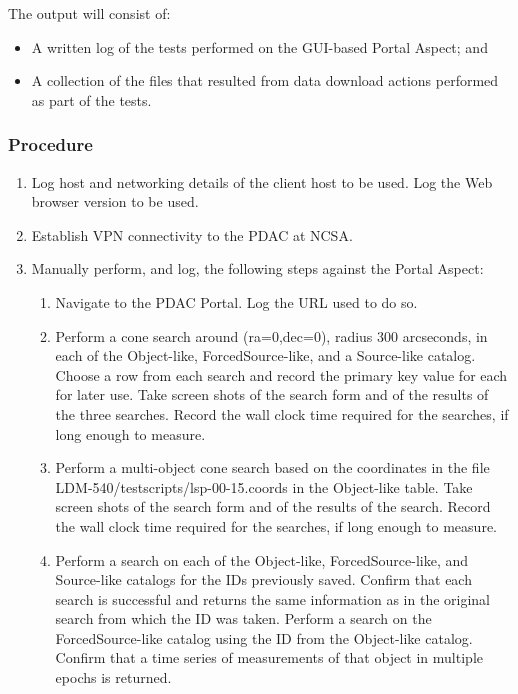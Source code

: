 The output will consist of:

\begin{itemize}
  \item{A written log of the tests performed on the GUI-based Portal Aspect; and}
  \item{A collection of the files that resulted from data download actions performed as part of the tests.}
\end{itemize}


\subsubsection{Procedure}

\begin{enumerate}

  \item{Log host and networking details of the client host to be used.
 Log the Web browser version to be used.}
  \item{Establish VPN connectivity to the PDAC at NCSA.}
  \item{Manually perform, and log, the following steps against the Portal Aspect:
    \begin{enumerate}
      \item{Navigate to the PDAC Portal.  Log the URL used to do so.}
      \item{Perform a cone search around (ra=0,dec=0), radius 300 arcseconds, in each of the Object-like, ForcedSource-like, and a Source-like catalog.
 Choose a row from each search and record the primary key value for each for later use.
 Take screen shots of the search form and of the results of the three searches.
 Record the wall clock time required for the searches, if long enough to measure.}
      \item{Perform a multi-object cone search based on the coordinates in the file LDM-540/test\textunderscore scripts/lsp-00-15.coords in the Object-like table.
 Take screen shots of the search form and of the results of the search.
 Record the wall clock time required for the searches, if long enough to measure.}
      \item{Perform a search on each of the Object-like, ForcedSource-like, and Source-like catalogs for the IDs previously saved.
 Confirm that each search is successful and returns the same information as in the original search from which the ID was taken.
 Perform a search on the ForcedSource-like catalog using the ID from the Object-like catalog.
 Confirm that a time series of measurements of that object in multiple epochs is returned.
}
\end{enumerate}}
\end{enumerate}

